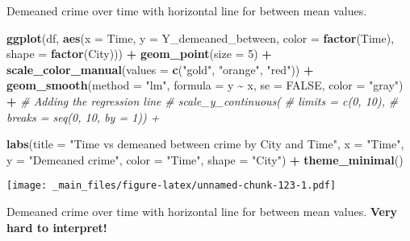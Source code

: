 \documentclass[
]{book}
\newenvironment{Shaded}{\begin{snugshade}}{\end{snugshade}}
\newcommand{\AttributeTok}[1]{\textcolor[rgb]{0.13,0.29,0.53}{#1}}
\newcommand{\CommentTok}[1]{\textcolor[rgb]{0.56,0.35,0.01}{\textit{#1}}}
\newcommand{\ConstantTok}[1]{\textcolor[rgb]{0.56,0.35,0.01}{#1}}
\newcommand{\DecValTok}[1]{\textcolor[rgb]{0.00,0.00,0.81}{#1}}
\newcommand{\FunctionTok}[1]{\textcolor[rgb]{0.13,0.29,0.53}{\textbf{#1}}}
\newcommand{\NormalTok}[1]{#1}
\newcommand{\SpecialCharTok}[1]{\textcolor[rgb]{0.81,0.36,0.00}{\textbf{#1}}}
\newcommand{\StringTok}[1]{\textcolor[rgb]{0.31,0.60,0.02}{#1}}
\begin{document}
Demeaned crime over time with horizontal line for between mean values.

\begin{Shaded}
\begin{Highlighting}[]
\FunctionTok{ggplot}\NormalTok{(df, }\FunctionTok{aes}\NormalTok{(}\AttributeTok{x =}\NormalTok{ Time, }\AttributeTok{y =}\NormalTok{ Y\_demeaned\_between, }\AttributeTok{color =} \FunctionTok{factor}\NormalTok{(Time), }\AttributeTok{shape =} \FunctionTok{factor}\NormalTok{(City))) }\SpecialCharTok{+}
  \FunctionTok{geom\_point}\NormalTok{(}\AttributeTok{size =} \DecValTok{5}\NormalTok{) }\SpecialCharTok{+}
  \FunctionTok{scale\_color\_manual}\NormalTok{(}\AttributeTok{values =} \FunctionTok{c}\NormalTok{(}\StringTok{"gold"}\NormalTok{, }\StringTok{"orange"}\NormalTok{, }\StringTok{"red"}\NormalTok{)) }\SpecialCharTok{+}
  \FunctionTok{geom\_smooth}\NormalTok{(}\AttributeTok{method =} \StringTok{"lm"}\NormalTok{, }\AttributeTok{formula =}\NormalTok{ y }\SpecialCharTok{\textasciitilde{}}\NormalTok{ x, }\AttributeTok{se =} \ConstantTok{FALSE}\NormalTok{, }\AttributeTok{color =} \StringTok{"gray"}\NormalTok{) }\SpecialCharTok{+}  \CommentTok{\# Adding the regression line}
  \CommentTok{\# scale\_y\_continuous(}
  \CommentTok{\# limits = c(0, 10),}
  \CommentTok{\# breaks = seq(0, 10, by = 1)) +}
  
  \FunctionTok{labs}\NormalTok{(}\AttributeTok{title =} \StringTok{"Time vs demeaned between crime by City and Time"}\NormalTok{,}
       \AttributeTok{x =} \StringTok{"Time"}\NormalTok{,}
       \AttributeTok{y =} \StringTok{"Demeaned crime"}\NormalTok{,}
       \AttributeTok{color =} \StringTok{"Time"}\NormalTok{,}
       \AttributeTok{shape =} \StringTok{"City"}\NormalTok{) }\SpecialCharTok{+}
  \FunctionTok{theme\_minimal}\NormalTok{()}
\end{Highlighting}
\end{Shaded}

\texttt{[image: \_main\_files/figure-latex/unnamed-chunk-123-1.pdf]}

Demeaned crime over time with horizontal line for between mean values. \textbf{Very hard to interpret!}
\end{document}
